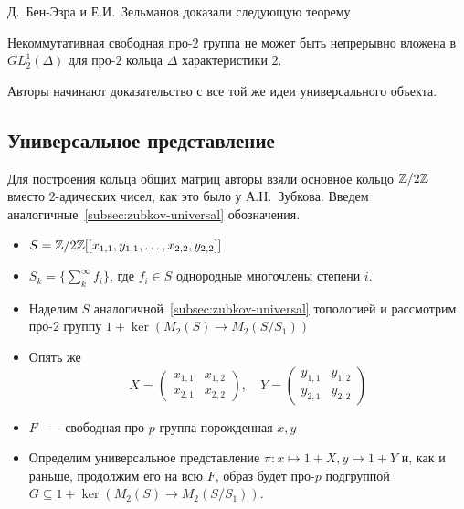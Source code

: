Д.\ Бен-Эзра и Е.И.\ Зельманов доказали следующую теорему
\vskip 0.1in\noindent
\begin{theorem}
    \label{thm:ben-ezra-zelmanov-main}
    Некоммутативная свободная про-$2$ группа не может быть непрерывно вложена в $GL^1_2(\Delta)$ для про-$2$ кольца $\Delta$ характеристики $2$.
\end{theorem}
\vskip 0.1in\noindent
Авторы начинают доказательство с все той же идеи универсального объекта.

\subsection{Универсальное представление}\label{subsec:ben-ezra-zelmanov-universal}
Для построения кольца общих матриц авторы взяли основное кольцо $\mathbb{Z}/2\mathbb{Z}$ вместо $2$-адических чисел, как это было у А.Н.\ Зубкова.
Введем аналогичные~\ref{subsec:zubkov-universal} обозначения.

\begin{itemize}
    \item $S = \mathbb{Z}/2\mathbb{Z} [[ x_{1,1}, y_{1,1}, \ldots, x_{2,2}, y_{2,2} ]]$
    \item $S_k = \{\sum\limits_k^{\infty} f_i \}$, где $f_i\in S$ однородные многочлены степени $i$.
    \item Наделим $S$ аналогичной~\ref{subsec:zubkov-universal} топологией и рассмотрим про-$2$ группу $1 + \ker{(M_2(S) \to M_2(S / S_1))}$
    \item Опять же
    \[
        X=
        \begin{pmatrix}
            x_{1,1} & x_{1,2} \\
            x_{2,1} & x_{2,2}
        \end{pmatrix},
        \quad
        Y=
        \begin{pmatrix}
            y_{1,1} & y_{1,2} \\
            y_{2,1} & y_{2,2}
        \end{pmatrix}
    \]
    \item $F$ ~--- свободная про-$p$ группа порожденная $x,y$
    \item Определим универсальное представление $\pi: x \mapsto 1 + X, y \mapsto 1 + Y$ и, как и раньше, продолжим его на всю $F$, образ будет про-$p$ подгруппой $G\subseteq 1 + \ker{(M_2(S) \to M_2(S / S_1))}$.
\end{itemize}

